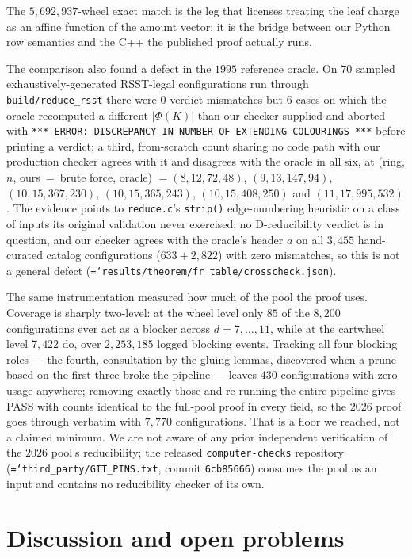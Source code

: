 \documentclass[11pt]{article}
\theoremstyle{definition}
\newcommand{\art}[1]{{\texttt{\hyphenchar\font=`\-\relax #1}}}
\begin{document}
The $5{,}692{,}937$-wheel exact match is the leg that licenses treating the leaf
charge as an affine function of the amount vector: it is the bridge between our
Python row semantics and the C++ the published proof actually runs.

The comparison also found a defect in the $1995$ reference oracle. On $70$
sampled exhaustively-generated RSST-legal configurations run through
\texttt{build/reduce\_rsst} there were $0$ verdict mismatches but $6$ cases on
which the oracle recomputed a different $|\Phi(K)|$ than our checker supplied and
aborted with \texttt{*** ERROR: DISCREPANCY IN NUMBER OF EXTENDING COLOURINGS
***} before printing a verdict; a third, from-scratch count sharing no code path
with our production checker agrees with it and disagrees with the oracle in all
six, at (ring, $n$, ours~=~brute force, oracle) $= (8, 12, 72, 48)$,
$(9, 13, 147, 94)$, $(10, 15, 367, 230)$, $(10, 15, 365, 243)$,
$(10, 15, 408, 250)$ and $(11, 17, 995, 532)$. The evidence points to
\texttt{reduce.c}'s \texttt{strip()} edge-numbering heuristic on a class of
inputs its original validation never exercised; no D-reducibility verdict is in
question, and our checker agrees with the oracle's header $a$ on all $3{,}455$
hand-curated catalog configurations ($633 + 2{,}822$) with zero mismatches, so
this is not a general defect
(\art{results/theorem/fr\_table/crosscheck.json}).

The same instrumentation measured how much of the pool the proof uses. Coverage
is sharply two-level: at the wheel level only $85$ of the $8{,}200$
configurations ever act as a blocker across $d=7,\dots,11$, while at the
cartwheel level $7{,}422$ do, over $2{,}253{,}185$ logged blocking events.
Tracking all four blocking roles --- the fourth, consultation by the gluing
lemmas, discovered when a prune based on the first three broke the pipeline ---
leaves $430$ configurations with zero usage anywhere; removing exactly those and
re-running the entire pipeline gives PASS with counts identical to the full-pool
proof in every field, so the $2026$ proof goes through verbatim with $7{,}770$
configurations. That is a floor we reached, not a claimed minimum. We are not
aware of any prior independent verification of the $2026$ pool's reducibility;
the released \texttt{computer-checks} repository
(\art{third\_party/GIT\_PINS.txt}, commit \texttt{6cb85666}) consumes the pool as
an input and contains no reducibility checker of its own.
\section{Discussion and open problems}
\label{sec:open}
\end{document}
